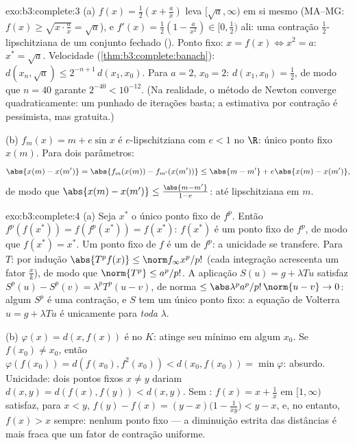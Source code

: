 \begin{solution}{exo:b3:complete:3}
(a) $f(x) = \frac12(x + \frac ax)$ leva $[\sqrt a, \infty)$ em
si mesmo (MA--MG: $f(x) \geq \sqrt{x \cdot \frac ax} = \sqrt a$),
e $f'(x) = \frac12(1 - \frac a{x^2}) \in [0, \frac12)$ ali:
uma contração $\frac12$-lipschitziana de um conjunto fechado ().
Ponto fixo: $x = f(x) \iff x^2 = a$: $x^* = \sqrt a$. Velocidade
(\cref{thm:b3:complete:banach}): $d(x_n, \sqrt a) \leq
2^{-n+1}\,d(x_1, x_0)$. Para $a = 2$, $x_0 = 2$: $d(x_1, x_0) =
\frac12$, de modo que $n = 40$ garante $2^{-40} < 10^{-12}$. (Na
realidade, o método de Newton converge quadraticamente: um punhado de
iterações basta; a estimativa por contração é pessimista, mas
gratuita.)

(b) $f_m(x) = m + e\sin x$ é $e$-lipschitziana com $e < 1$ no
 $\R$: único ponto fixo $x(m)$. Para dois parâmetros:
\[
\abs{x(m) - x(m')} = \abs{f_m(x(m)) - f_{m'}(x(m'))}
\leq \abs{m - m'} + e\abs{x(m) - x(m')},
\]
de modo que $\abs{x(m) - x(m')} \leq \frac{\abs{m - m'}}{1 - e}$: até
lipschitziana em $m$.
\end{solution}

\begin{solution}{exo:b3:complete:4}
(a) Seja $x^*$ o único ponto fixo de $f^p$. Então
$f^p(f(x^*)) = f(f^p(x^*)) = f(x^*)$: $f(x^*)$ é um ponto fixo
de $f^p$, de modo que $f(x^*) = x^*$. Um ponto fixo de $f$ é um de
$f^p$: a unicidade se transfere. Para $T$: por indução $\abs{T^pf(x)}
\leq \norm f_\infty x^p/p!$ (cada integração acrescenta um fator
$\frac xk$), de modo que $\norm{T^p} \leq a^p/p!$. A aplicação $S(u) = g +
\lambda Tu$ satisfaz $S^p(u) - S^p(v) = \lambda^pT^p(u - v)$,
de norma $\leq \abs\lambda^pa^p/p!\,\norm{u - v} \to 0$: algum
$S^p$ é uma contração, e $S$ tem um único ponto fixo: a
equação de Volterra $u = g + \lambda Tu$ é unicamente  para
\emph{toda} $\lambda$.

(b) $\varphi(x) = d(x, f(x))$ é  no  $K$:
atinge seu mínimo em algum $x_0$. Se $f(x_0) \neq x_0$,
então $\varphi(f(x_0)) = d(f(x_0), f^2(x_0)) < d(x_0, f(x_0)) =
\min\varphi$: absurdo. Unicidade: dois pontos fixos $x \ne y$
dariam $d(x,y) = d(f(x), f(y)) < d(x,y)$. Sem
: $f(x) = x + \frac1x$ em $[1, \infty)$ satisfaz,
para $x < y$, $f(y) - f(x) = (y - x)\bigl(1 - \frac1{xy}\bigr) <
y - x$, e, no entanto, $f(x) > x$ sempre: nenhum ponto fixo --- a diminuição estrita
das distâncias é mais fraca que um fator de contração uniforme.
\end{solution}


